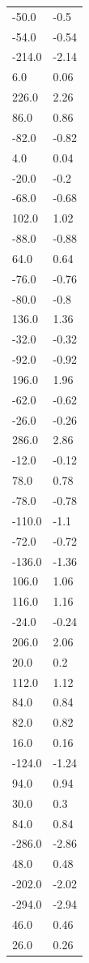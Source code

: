 \begin{longtable}{ll}
-50.0 & -0.5 \\
-54.0 & -0.54 \\
-214.0 & -2.14 \\
6.0 & 0.06 \\
226.0 & 2.26 \\
86.0 & 0.86 \\
-82.0 & -0.82 \\
4.0 & 0.04 \\
-20.0 & -0.2 \\
-68.0 & -0.68 \\
102.0 & 1.02 \\
-88.0 & -0.88 \\
64.0 & 0.64 \\
-76.0 & -0.76 \\
-80.0 & -0.8 \\
136.0 & 1.36 \\
-32.0 & -0.32 \\
-92.0 & -0.92 \\
196.0 & 1.96 \\
-62.0 & -0.62 \\
-26.0 & -0.26 \\
286.0 & 2.86 \\
-12.0 & -0.12 \\
78.0 & 0.78 \\
-78.0 & -0.78 \\
-110.0 & -1.1 \\
-72.0 & -0.72 \\
-136.0 & -1.36 \\
106.0 & 1.06 \\
116.0 & 1.16 \\
-24.0 & -0.24 \\
206.0 & 2.06 \\
20.0 & 0.2 \\
112.0 & 1.12 \\
84.0 & 0.84 \\
82.0 & 0.82 \\
16.0 & 0.16 \\
-124.0 & -1.24 \\
94.0 & 0.94 \\
30.0 & 0.3 \\
84.0 & 0.84 \\
-286.0 & -2.86 \\
48.0 & 0.48 \\
-202.0 & -2.02 \\
-294.0 & -2.94 \\
46.0 & 0.46 \\
26.0 & 0.26 \\

\end{longtable}
